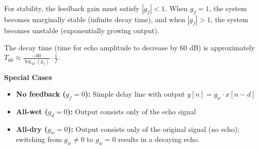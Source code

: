 For stability, the feedback gain must satisfy $|g_f| < 1$. When $g_f =
1$, the system becomes marginally stable (infinite decay time), and
when $|g_f| > 1$, the system becomes unstable (exponentially growing
output).

The decay time (time for echo amplitude to decrease by 60 dB) is
approximately $T_{60} \approx \frac{-60}{\log_{10}(g_f)} \cdot
\frac{1}{f}$.

{\bf Special Cases}
\begin{itemize}
\item \textbf{No feedback ($g_f = 0$):} Simple delay line with
  output $y[n] = g_w \cdot x[n-d]$
  
\item \textbf{All-wet ($g_d = 0$):} Output consists only of the echo
  signal
  
\item \textbf{All-dry ($g_w = 0$):} Output consists only of the
  original signal (no echo); switching from $g_w \ne 0$ to $g_w = 0$
  results in a decaying echo.
\end{itemize}





